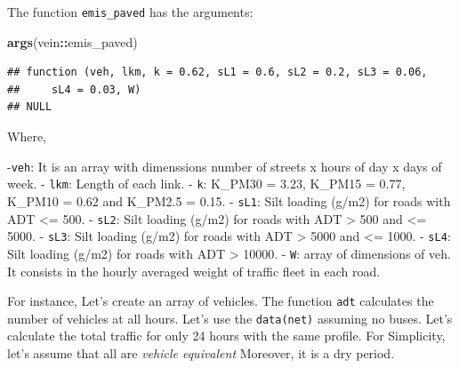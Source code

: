 \documentclass[12pt,graybox,envcountchap,sectrefs]{krantz}
\makeatletter
\newenvironment{Shaded}{\begin{snugshade}}{\end{snugshade}}
\newcommand{\KeywordTok}[1]{\textcolor[rgb]{0.13,0.29,0.53}{\textbf{#1}}}
\newcommand{\OperatorTok}[1]{\textcolor[rgb]{0.81,0.36,0.00}{\textbf{#1}}}
\newcommand{\NormalTok}[1]{#1}
\newenvironment{kframe}{%
\medskip{}
\setlength{\fboxsep}{.8em}
 \def\at@end@of@kframe{}%
 \ifinner\ifhmode%
  \def\at@end@of@kframe{\end{minipage}}%
  \begin{minipage}{\columnwidth}%
 \fi\fi%
 \def\FrameCommand##1{\hskip\@totalleftmargin \hskip-\fboxsep
 \colorbox{shadecolor}{##1}\hskip-\fboxsep
     \hskip-\linewidth \hskip-\@totalleftmargin \hskip\columnwidth}%
 \MakeFramed {\advance\hsize-\width
   \@totalleftmargin\z@ \linewidth\hsize
   \@setminipage}}%
 {\par\unskip\endMakeFramed%
 \at@end@of@kframe}
\renewenvironment{Shaded}{\begin{kframe}}{\end{kframe}}
\theoremstyle{definition}
\theoremstyle{definition}
\theoremstyle{definition}
\theoremstyle{remark}
\makeatother
\begin{document}
The function \texttt{emis\_paved} has the arguments:

\begin{Shaded}
\begin{Highlighting}[]
\KeywordTok{args}\NormalTok{(vein}\OperatorTok{::}\NormalTok{emis_paved)}
\end{Highlighting}
\end{Shaded}

\begin{verbatim}
## function (veh, lkm, k = 0.62, sL1 = 0.6, sL2 = 0.2, sL3 = 0.06, 
##     sL4 = 0.03, W) 
## NULL
\end{verbatim}

Where,

-\texttt{veh}: It is an array with dimenssions number of streets x hours
of day x days of week. - \texttt{lkm}: Length of each link. -
\texttt{k}: K\_PM30 = 3.23, K\_PM15 = 0.77, K\_PM10 = 0.62 and K\_PM2.5
= 0.15. - \texttt{sL1}: Silt loading (g/m2) for roads with ADT
\textless{}= 500. - \texttt{sL2}: Silt loading (g/m2) for roads with ADT
\textgreater{} 500 and \textless{}= 5000. - \texttt{sL3}: Silt loading
(g/m2) for roads with ADT \textgreater{} 5000 and \textless{}= 1000. -
\texttt{sL4}: Silt loading (g/m2) for roads with ADT \textgreater{}
10000. - \texttt{W}: array of dimensions of veh. It consists in the
hourly averaged weight of traffic fleet in each road.

For instance, Let's create an array of vehicles. The function
\texttt{adt} calculates the number of vehicles at all hours. Let's use
the \texttt{data(net)} assuming no buses. Let's calculate the total
traffic for only 24 hours with the same profile. For Simplicity, let's
assume that all are \emph{vehicle equivalent} Moreover, it is a dry
period.
\end{document}
